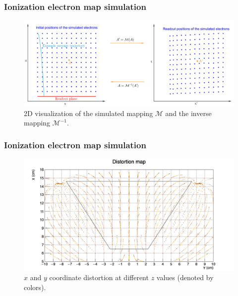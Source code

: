 \documentclass{beamer}
\begin{document}
	\begin{frame}
		\frametitle{Ionization electron map simulation}
		\begin{figure}
			\centering
			\includegraphics[width=\textwidth]{../images/map_visualization_big.png}
			\small{2D visualization of the simulated mapping $\mathcal{M}$ and the inverse mapping $\mathcal{M}^{-1}$.}
		\end{figure}
	\end{frame}
	\begin{frame}
		\frametitle{Ionization electron map simulation}
		\begin{figure}
			\centering
			\includegraphics[height=0.68\textheight]{../images/map_dist.png}\\
			\small{$x$ and $y$ coordinate distortion at different $z$ values (denoted by colors).}
		\end{figure}
	\end{frame}
\end{document}

